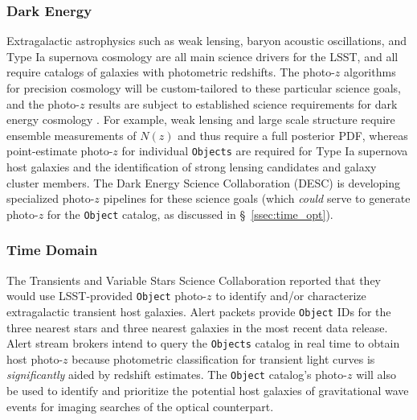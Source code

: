 \documentclass[DM,lsstdraft,toc]{lsstdoc}
\begin{document}
\subsubsection{Dark Energy}\label{sssec:use_sci_de}
Extragalactic astrophysics such as weak lensing, baryon acoustic oscillations, and Type Ia supernova cosmology are all main science drivers for the LSST, and all require catalogs of galaxies with photometric redshifts.
The photo-$z$ algorithms for precision cosmology will be custom-tailored to these particular science goals, and the photo-$z$ results are subject to established science requirements for dark energy cosmology \citep{2018arXiv180901669T}.
For example, weak lensing and large scale structure require ensemble measurements of $N(z)$ and thus require a full posterior PDF, whereas point-estimate photo-$z$ for individual {\tt Objects} are required for Type Ia supernova host galaxies and the identification of strong lensing candidates and galaxy cluster members. 
The Dark Energy Science Collaboration (DESC) is developing specialized photo-$z$ pipelines for these science goals (which {\it could} serve to generate photo-$z$ for the {\tt Object} catalog, as discussed in \S~\ref{ssec:time_opt}).

\subsubsection{Time Domain}\label{sssec:use_sci_td}
The Transients and Variable Stars Science Collaboration reported that they would use LSST-provided {\tt Object} photo-$z$ to identify and/or characterize extragalactic transient host galaxies.
Alert packets provide {\tt Object} IDs for the three nearest stars and three nearest galaxies in the most recent data release.
Alert stream brokers intend to query the {\tt Objects} catalog in real time to obtain host photo-$z$ because photometric classification for transient light curves is {\it significantly} aided by redshift estimates.
The {\tt Object} catalog's photo-$z$ will also be used to identify and prioritize the potential host galaxies of gravitational wave events for imaging searches of the optical counterpart.
\end{document}
